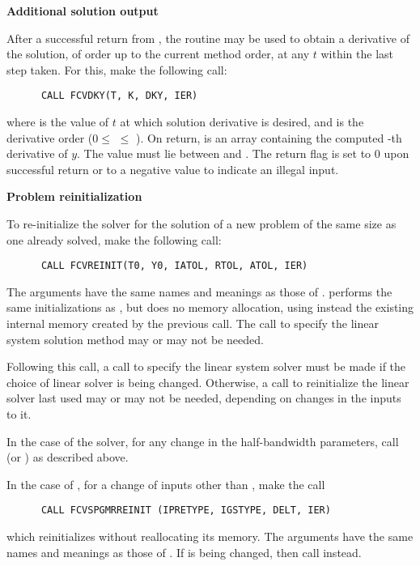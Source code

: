 \begin{Steps}
\item {\bf Additional solution output}

  After a successful return from , the routine  may be
  used to obtain a derivative of the solution, of order up to the current method
  order, at any $t$ within the last step taken.  For this, make the following call:
\begin{verbatim}
      CALL FCVDKY(T, K, DKY, IER)
\end{verbatim}
  where
   is the value of $t$ at which solution derivative is desired, and
   is the derivative order ($0 \le$  $\le$ ).
  On return,  is an array containing the computed -th derivative
  of $y$.  The value  must lie between  and .
  The return flag  is set to $0$ upon successful return or to a negative
  value to indicate an illegal input.
  
\item {\bf Problem reinitialization}

  To re-initialize the {\cvode} solver for the solution of a new problem
  of the same size as one already solved, make the following call:
\begin{verbatim}
      CALL FCVREINIT(T0, Y0, IATOL, RTOL, ATOL, IER)
\end{verbatim}
  The arguments have the same names and meanings as those of .
   performs the same initializations as
  , but does no memory allocation, using instead the existing
  internal memory created by the previous  call.  The call to
  specify the linear system solution method may or may not be needed.

  Following this call, a call to specify the linear system solver must be
  made if the choice of linear solver is being changed.  Otherwise, a call
  to reinitialize the linear solver last used may or may not be needed,
  depending on changes in the inputs to it.

  In the case of the {\band} solver, for any change in the half-bandwidth
  parameters, call  (or ) as described above.

  In the case of {\spgmr}, for a change of inputs other than ,
  make the call
\begin{verbatim}
      CALL FCVSPGMRREINIT (IPRETYPE, IGSTYPE, DELT, IER)
\end{verbatim}
  which reinitializes {\spgmr} without reallocating its memory.
  The arguments have the same names and meanings as those of .
  If  is being changed, then call  instead.


\end{Steps}
